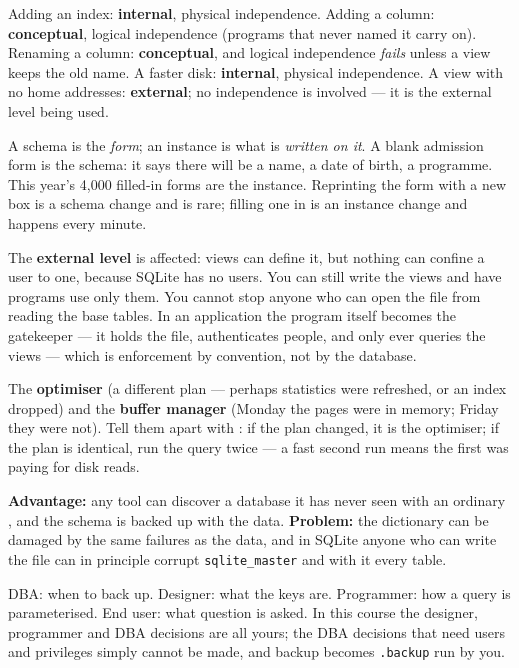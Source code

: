 \begin{ans}
  \item Adding an index: \textbf{internal}, physical independence. Adding a
        column: \textbf{conceptual}, logical independence (programs that never
        named it carry on). Renaming a column: \textbf{conceptual}, and logical
        independence \emph{fails} unless a view keeps the old name. A faster
        disk: \textbf{internal}, physical independence. A view with no home
        addresses: \textbf{external}; no independence is involved --- it is
        the external level being used.
  \item A schema is the \emph{form}; an instance is what is \emph{written on
        it}. A blank admission form is the schema: it says there will be a
        name, a date of birth, a programme. This year's 4{,}000 filled-in
        forms are the instance. Reprinting the form with a new box is a schema
        change and is rare; filling one in is an instance change and happens
        every minute.
  \item The \textbf{external level} is affected: views can define it, but
        nothing can confine a user to one, because SQLite has no users. You can
        still write the views and have programs use only them. You cannot stop
        anyone who can open the file from reading the base tables. In an
        application the program itself becomes the gatekeeper --- it holds the
        file, authenticates people, and only ever queries the views --- which
        is enforcement by convention, not by the database.
\end{ans}

\begin{ans}
  \item The \textbf{optimiser} (a different plan --- perhaps statistics were
        refreshed, or an index dropped) and the \textbf{buffer manager} (Monday
        the pages were in memory; Friday they were not). Tell them apart with
        : if the plan changed, it is the optimiser;
        if the plan is identical, run the query twice --- a fast second run
        means the first was paying for disk reads.
  \item \textbf{Advantage:} any tool can discover a database it has never
        seen with an ordinary , and the schema is backed up with
        the data. \textbf{Problem:} the dictionary can be damaged by the same
        failures as the data, and in SQLite anyone who can write the file can
        in principle corrupt \texttt{sqlite\_master} and with it every table.
  \item DBA: when to back up. Designer: what the keys are. Programmer: how a
        query is parameterised. End user: what question is asked. In this
        course the designer, programmer and DBA decisions are all yours; the
        DBA decisions that need users and privileges simply cannot be made,
        and backup becomes \texttt{.backup} run by you.
\end{ans}

